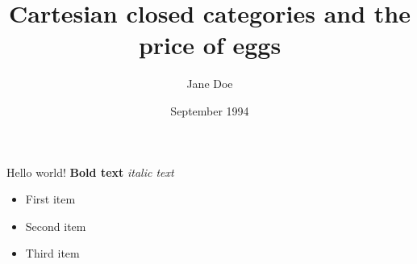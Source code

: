 \documentclass{article}
\title{Cartesian closed categories
  and the price of eggs}
\author{Jane Doe}
\date{September 1994}
\begin{document}
\maketitle
\huge
Hello world!
\textbf{Bold text}
\textit{italic text}

\begin{itemize}
\item First item
\item Second item
\item Third item
\end{itemize}
\end{document}
